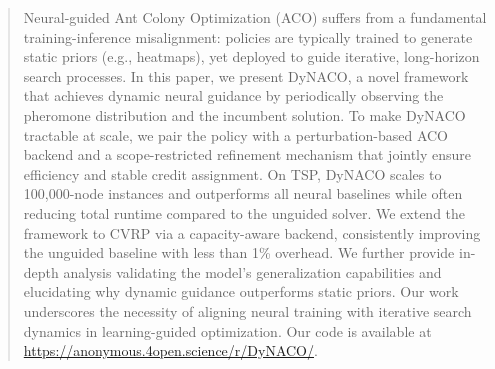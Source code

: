 \documentclass[sigconf]{acmart}
\begin{document}
\begin{abstract}


Neural-guided Ant Colony Optimization (ACO) suffers from a fundamental training-inference misalignment: policies are typically trained to generate static priors (e.g., heatmaps), yet deployed to guide iterative, long-horizon search processes. In this paper, we present DyNACO, a novel framework that achieves dynamic neural guidance by periodically observing the pheromone distribution and the incumbent solution. To make DyNACO tractable at scale, we pair the policy with a perturbation-based ACO backend and a scope-restricted refinement mechanism that jointly ensure efficiency and stable credit assignment. On TSP, DyNACO scales to 100,000-node instances and outperforms all neural baselines while often reducing total runtime compared to the unguided solver. We extend the framework to CVRP via a capacity-aware backend, consistently improving the unguided baseline with less than 1\% overhead. We further provide in-depth analysis validating the model's generalization capabilities and elucidating why dynamic guidance outperforms static priors. Our work underscores the necessity of aligning neural training with iterative search dynamics in learning-guided optimization. Our code is available at \url{https://anonymous.4open.science/r/DyNACO/}.
\end{abstract}
\end{document}
